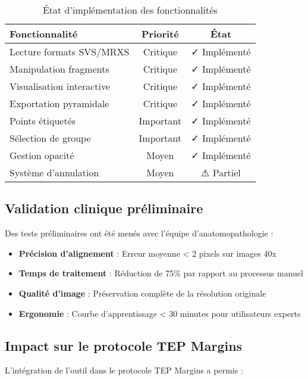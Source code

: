 \documentclass[12pt,a4paper]{report}
\begin{document}
\begin{table}[H]
\centering
\caption{État d'implémentation des fonctionnalités}
\begin{tabular}{@{}lcc@{}}
\toprule
\textbf{Fonctionnalité} & \textbf{Priorité} & \textbf{État} \\
\midrule
Lecture formats SVS/MRXS & Critique & ✓ Implémenté \\
Manipulation fragments & Critique & ✓ Implémenté \\
Visualisation interactive & Critique & ✓ Implémenté \\
Exportation pyramidale & Critique & ✓ Implémenté \\
Points étiquetés & Important & ✓ Implémenté \\
Sélection de groupe & Important & ✓ Implémenté \\
Gestion opacité & Moyen & ✓ Implémenté \\
Système d'annulation & Moyen & ⚠ Partiel \\
\bottomrule
\end{tabular}
\label{tab:fonctionnalites-implementees}
\end{table}

\subsection{Validation clinique préliminaire}

Des tests préliminaires ont été menés avec l'équipe d'anatomopathologie :

\begin{itemize}
    \item \textbf{Précision d'alignement} : Erreur moyenne < 2 pixels sur images 40x
    \item \textbf{Temps de traitement} : Réduction de 75\% par rapport au processus manuel
    \item \textbf{Qualité d'image} : Préservation complète de la résolution originale
    \item \textbf{Ergonomie} : Courbe d'apprentissage < 30 minutes pour utilisateurs experts
\end{itemize}

\subsection{Impact sur le protocole TEP Margins}

L'intégration de l'outil dans le protocole TEP Margins a permis :
\end{document}
